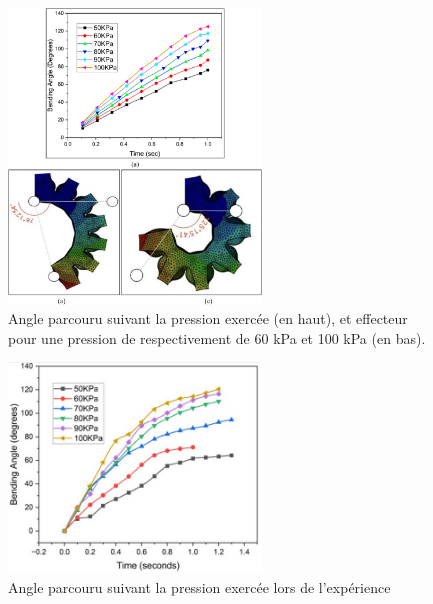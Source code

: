 \documentclass[a4paper, 11pt]{report}
\begin{document}
            \begin{figure}
                \centering
                \includegraphics[width=0.6\textwidth]{Figures/angle_pression.jpg}
                \caption{Angle parcouru suivant la pression exercée (en haut), et effecteur pour une pression de respectivement de 60 kPa et 100 kPa (en bas).\cite{bhat_numerical_2025}}
                \label{fig:angle_pression}
            \end{figure}

            \begin{figure}
                \centering
                \includegraphics[width=0.6\textwidth]{Figures/angle_pression_experiments.PNG}
                \caption{Angle parcouru suivant la pression exercée lors de l'expérience \cite{bhat_numerical_2025}}
                \label{fig:angle_pression_experiments}
            \end{figure}
\end{document}
